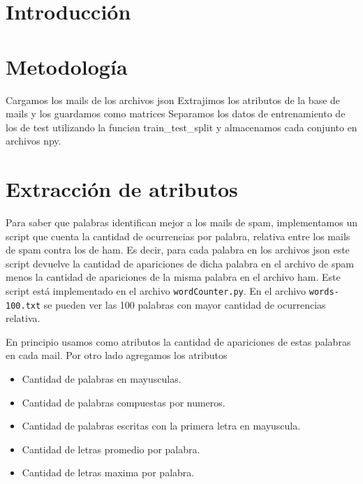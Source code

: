 \documentclass[10pt, a4paper]{article}
\begin{document}
\fecha{\today}



\maketitle
\tableofcontents
\newpage

\section*{Introducción}

\section{Metodología}
Cargamos los mails de los archivos json
Extrajimos los atributos de la base de mails y los guardamos como matrices
Separamos los datos de entrenamiento de los de test utilizando la funciøn train\_test\_split y almacenamos cada conjunto en archivos npy.

\section{Extracción de atributos}
Para saber que palabras identifican mejor a los mails de spam, implementamos un script que cuenta la cantidad de ocurrencias por palabra, relativa entre los mails de spam contra los de ham.
Es decir, para cada palabra en los archivos json este script devuelve la cantidad de apariciones de dicha palabra en el archivo de spam menos la cantidad de apariciones de la misma palabra en el archivo ham.
Este script está implementado en el archivo \texttt{wordCounter.py}. En el archivo \texttt{words-100.txt} se pueden ver las 100 palabras con mayor cantidad de ocurrencias relativa.

En principio usamos como atributos la cantidad de apariciones de estas palabras en cada mail. Por otro lado agregamos los atributos

\begin{itemize}
\item Cantidad de palabras en mayusculas.
\item Cantidad de palabras compuestas por numeros.
\item Cantidad de palabras escritas con la primera letra en mayuscula.
\item Cantidad de letras promedio por palabra.
\item Cantidad de letras maxima por palabra.
\end{itemize}
\end{document}
